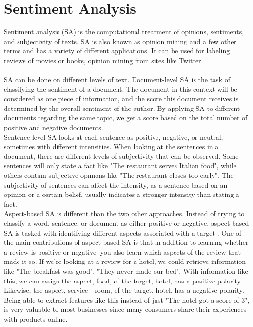 \documentclass{report}
\begin{document}
\section{Sentiment Analysis}
Sentiment analysis (SA) is the computational treatment of opinions, sentiments, and subjectivity of texts. SA is also known as opinion mining and a few other terms and has a variety of different applications. It can be used for labeling reviews of movies or books, opinion mining from sites like Twitter.\\\\%
SA can be done on different levels of text. Document-level SA is the task of classifying the sentiment of a document. The document in this context will be considered as one piece of information, and the score this document receives is determined by the overall sentiment of the author. By applying SA to different documents regarding the same topic, we get a score based on the total number of positive and negative documents.\\
Sentence-level SA looks at each sentence as positive, negative, or neutral, sometimes with different intensities. When looking at the sentences in a document, there are different levels of subjectivity that can be observed. Some sentences will only state a fact like "The restaurant serves Italian food", while others contain subjective opinions like "The restaurant closes too early". The subjectivity of sentences can affect the intensity, as a sentence based on an opinion or a certain belief, usually indicates a stronger intensity than stating a fact.\\%
Aspect-based SA is different than the two other approaches. Instead of trying to classify a word, sentence, or document as either positive or negative, aspect-based SA is tasked with identifying different aspects associated with a target \cite{pontiki-etal-2016-semeval}. One of the main contributions of aspect-based SA is that in addition to learning whether a review is positive or negative, you also learn which aspects of the review that made it so. If we're looking at a review for a hotel, we could retrieve information like "The breakfast was good", "They never made our bed". With information like this, we can assign the aspect, food, of the target, hotel, has a positive polarity. Likewise, the aspect, service - room, of the target, hotel, has a negative polarity. Being able to extract features like this instead of just "The hotel got a score of 3", is very valuable to most businesses since many consumers share their experiences with products online.\\\\
\end{document}
